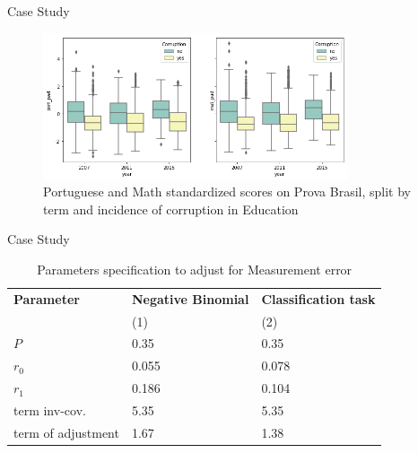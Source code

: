 \documentclass[handout,t,usenames,dvipsnames]{beamer}
\begin{document}
\begin{frame}{Case Study}


\begin{figure}[h!]
\includegraphics[width=9cm]{port_mat_pad_grave.png}
\centering
\caption{Portuguese and Math standardized scores on Prova Brasil, split by term and incidence of corruption in Education}
\end{figure}
\end{frame}


\begin{frame}{Case Study}
\justifying
\vspace{0.5em}
\small

\begin{table}[h!]
\centering
\caption{\small Parameters specification to adjust for Measurement error}
\label{fork}
\small
\begin{tabular}{p{4cm}C{4cm}C{4cm}}
\toprule
\textbf{Parameter} & \textbf{Negative Binomial}  & \textbf{Classification task} \\
{} & (1) &  (2)\\\midrule
$P$ & 0.35 &  0.35  \\
$r_0$ &  0.055 & 0.078\\
$r_1$   &  0.186 &  0.104\\\midrule
term inv-cov.  &  5.35 &  5.35\\\midrule
term of adjustment &  1.67 &  1.38\\
\bottomrule
\end{tabular}

\end{table}


\end{frame}
\end{document}
